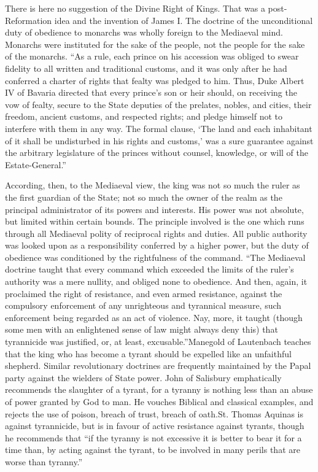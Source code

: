 \documentclass{book}
\begin{document}
There is here no suggestion of the Divine Right of Kings. That was a post-Reformation idea and the invention of James I. The doctrine of the unconditional duty of obedience to monarchs was wholly foreign to the Mediaeval mind. Monarchs were instituted for the sake of the people, not the people for the sake of the monarchs. “As a rule, each prince on his accession was obliged to swear fidelity to all written and traditional customs, and it was only after he had conferred a charter of rights that fealty was pledged to him. Thus, Duke Albert IV of Bavaria directed that every prince’s son or heir should, on receiving the vow of fealty, secure to the State deputies of the prelates, nobles, and cities, their freedom, ancient customs, and respected rights; and pledge himself not to interfere with them in any way. The formal clause, ‘The land and each inhabitant of it shall be undisturbed in his rights and customs,’ was a sure guarantee against the arbitrary legislature of the princes without counsel, knowledge, or will of the Estate-General.”\footnotemark[5]

According, then, to the Mediaeval view, the king was not so much the ruler as the first guardian of the State; not so much the owner of the realm as the principal administrator of its powers and interests. His power was not absolute, but limited within certain bounds. The principle involved is the one which runs through all Mediaeval polity of reciprocal rights and duties. All public authority was looked upon as a responsibility conferred by a higher power, but the duty of obedience was conditioned by the rightfulness of the command. “The Mediaeval doctrine taught that every command which exceeded the limits of the ruler’s authority was a mere nullity, and obliged none to obedience. And then, again, it proclaimed the right of resistance, and even armed resistance, against the compulsory enforcement of any unrighteous and tyrannical measure, such enforcement being regarded as an act of violence. Nay, more, it taught (though some men with an enlightened sense of law might always deny this) that tyrannicide was justified, or, at least, excusable.”\footnotemark[6] Manegold of Lautenbach teaches that the king who has become a tyrant should be expelled like an unfaithful shepherd. Similar revolutionary doctrines are frequently maintained by the Papal party against the wielders of State power. John of Salisbury emphatically recommends the slaughter of a tyrant, for a tyranny is nothing less than an abuse of power granted by God to man. He vouches Biblical and classical examples, and rejects the use of poison, breach of trust, breach of oath.\footnotemark[7] St. Thomas Aquinas is against tyrannicide, but is in favour of active resistance against tyrants, though he recommends that “if the tyranny is not excessive it is better to bear it for a time than, by acting against the tyrant, to be involved in many perils that are worse than tyranny.”\footnotemark[8]
\end{document}
